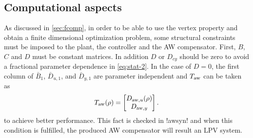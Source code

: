 \documentclass[fleqn,11pt]{article}
\newcommand{\lcode}[1]{\textbf{%
    \lstinline[style=mystyle]{#1}}}
\begin{document}
%

\subsection{Computational aspects}\label{sec:scomp}

As discussed in \cref{sec:fcomp}, in order to be able to use the vertex property and obtain a finite dimensional optimization problem, some structural constraints must be imposed to the plant, the controller and the AW compensator. First, $B$, $C$ and $D$ must be constant matrices. In addition $D$ or $D_{cy}$ should be zero to avoid a fractional parameter dependence in \cref{eq:stat-2}. In the case of $D=0$, the first column of $\bar{B}_1$, $\bar{D}_{u,1}$, and $\bar{D}_{y,1}$ are parameter independent and $T_{\mathrm{aw}}$ can be taken as
\begin{equation*}
    T_{\mathrm{aw}}(\rho) =
    \begin{bmatrix}
        D_{\mathrm{aw},u}(\rho) \\
        D_{\mathrm{aw},y}
    \end{bmatrix}.
\end{equation*}
to achieve better performance. This fact is checked in !awsyn! and when this condition is fulfilled, the produced AW compensator will result an LPV system.
\end{document}
